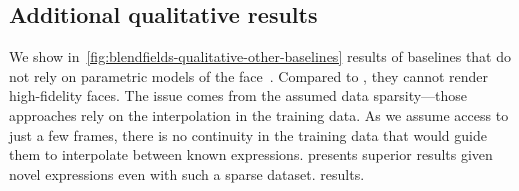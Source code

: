   \subsection{Additional qualitative results}

    We show in~\cref{fig:blendfields-qualitative-other-baselines} results of
    baselines that do not rely on parametric models of the
    face~\cite{li2017flame}.
    Compared to \blendfields, they cannot render high-fidelity faces.
    The issue comes from the assumed data sparsity---those approaches rely on
    the interpolation in the training data.
    As we assume access to just a few frames, there is no continuity in the
    training data that would guide them to interpolate between known
    expressions.
    \blendfields presents superior results given novel expressions even with such a sparse dataset.
    results.

    \clearpage
    
    